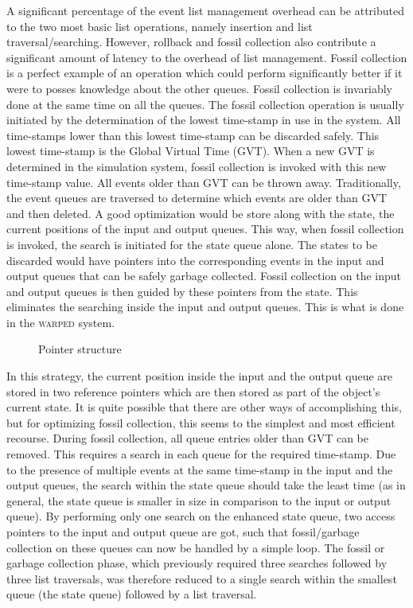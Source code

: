\documentclass[11pt]{report}
\begin{document}
A significant percentage of the event list management overhead can be
attributed to the two most basic list operations, namely insertion and
list traversal/searching. However, rollback and fossil collection also
contribute a significant amount of latency to the overhead of list
management.  Fossil collection is a perfect example of an operation which
could perform significantly better if it were to posses knowledge about
the other queues. Fossil collection is invariably done at the same time on
all the queues. The fossil collection operation is usually initiated by
the determination of the lowest time-stamp in use in the system. All
time-stamps lower than this lowest time-stamp can be discarded
safely. This lowest time-stamp is the Global Virtual Time (GVT). When a
new GVT is determined in the simulation system, fossil collection is
invoked with this new time-stamp value. All events older than GVT can be
thrown away. Traditionally, the event queues are traversed to determine
which events are older than GVT and then deleted. A good optimization
would be store along with the state, the current positions of the input
and output queues. This way, when fossil collection is invoked, the search
is initiated for the state queue alone. The states to be discarded would
have pointers into the corresponding events in the input and output queues
that can be safely garbage collected. Fossil collection on the input and
output queues is then guided by these pointers from the state. This
eliminates the searching inside the input and output queues. This is what
is done in the \textsc{warped} system.

\begin{figure}
\centerline{}
\caption{Pointer structure\label{fig:pointer}}
\end{figure}

In this strategy, the current position inside the input and the output
queue are stored in two reference pointers which are then stored as part
of the object's current state.  It is quite possible that there are other
ways of accomplishing this, but for optimizing fossil collection, this
seems to the simplest and most efficient recourse.  During fossil
collection, all queue entries older than GVT can be removed.  This
requires a search in each queue for the required time-stamp.  Due to the
presence of multiple events at the same time-stamp in the input and the
output queues, the search within the state queue should take the least
time (as in general, the state queue is smaller in size in comparison to
the input or output queue).  By performing only one search on the enhanced
state queue, two access pointers to the input and output queue are got,
such that fossil/garbage collection on these queues can now be handled by
a simple loop. The fossil or garbage collection phase, which previously
required three searches followed by three list traversals, was therefore
reduced to a single search within the smallest queue (the state queue)
followed by a list traversal.
\end{document}
